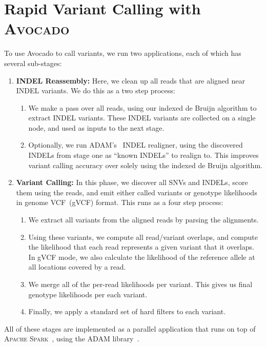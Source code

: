 \documentclass[phd]{ucbthesis}
\begin{document}
\chapter{Rapid Variant Calling with \textsc{Avocado}}
\label{chap:avocado}

To use Avocado to call variants, we run two applications, each of which has several
sub-stages:

\begin{enumerate}
\item \textbf{INDEL Reassembly:} Here, we clean up all reads that are aligned
near INDEL variants. We do this as a two step process:
\begin{enumerate}
\item We make a pass over all reads, using our indexed de Bruijn algorithm
to extract INDEL variants. These INDEL variants are collected on a single node,
and used as inputs to the next stage.
\item Optionally, we run \textsc{ADAM}'s~\cite{massie13, nothaft15} INDEL realigner,
using the discovered INDELs from stage one as ``known INDELs'' to realign to.
This improves variant calling accuracy over solely using the indexed de
Bruijn algorithm.
\end{enumerate}
\item \textbf{Variant Calling:} In this phase, we discover all SNVs and INDELs,
score them using the reads, and emit either called variants or genotype
likelihoods in genome VCF~(gVCF) format. This runs as a four step process:
\begin{enumerate}
\item We extract all variants from the aligned reads by parsing the alignments.
\item Using these variants, we compute all read/variant overlaps, and compute
the likelihood that each read represents a given variant that it overlaps. In
gVCF mode, we also calculate the likelihood of the reference allele at all
locations covered by a read.
\item We merge all of the per-read likelihoods per variant. This gives us final
genotype likelihoods per each variant.
\item Finally, we apply a standard set of hard filters to each variant.
\end{enumerate}
\end{enumerate}

All of these stages are implemented as a parallel application that runs on top of
\textsc{Apache Spark}~\cite{zaharia10, zaharia12}, using the \textsc{ADAM}
library~\cite{massie13, nothaft15}.
\end{document}
